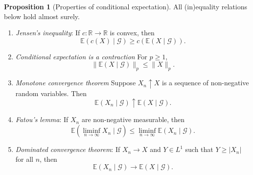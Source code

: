 \documentclass[parskip=full]{article}
\theoremstyle{definition}
\newtheorem{proposition}{Proposition}[section]
\newcommand{\R}{\mathbb{R}}
\newcommand{\1}{\mathbbm{1}}
\newcommand{\E}{\mathbb{E}}
\begin{document}
\begin{proposition}[Properties of conditional expectation] 
  \label{Properties of conditional expectation}
  All (in)equality relations below hold almost surely.
  \begin{enumerate}
    \item \emph{Jensen's inequality}: If $c: \R \to \R$ is convex, then
          \[
            \E(c(X) \mid \mathcal{G}) \geq c(\E(X \mid \mathcal{G})).
          \]
    \item \emph{Conditional expectation is a contraction} For $p \geq 1$,
          \[
            \|\E(X \mid \mathcal{G})\|_p \leq \|X\|_p.
          \]
    \item \emph{Monotone convergence theorem} Suppose $X_n \uparrow X$ is a sequence of non-negative random variables. Then
          \[
            \E(X_n\mid \mathcal{G}) \uparrow \E(X \mid \mathcal{G}).
          \]
    \item \emph{Fatou's lemma}: If $X_n$ are non-negative measurable, then
          \[
            \E\left(\liminf_{n \to \infty} X_n \mid \mathcal{G}\right) \leq \liminf_{n \to \infty} \E(X_n \mid \mathcal{G}).
          \]
    \item \emph{Dominated convergence theorem}: If $X_n \to X$ and $Y \in L^1$ such that $Y \geq |X_n|$ for all $n$, then
          \[
            \E(X_n \mid \mathcal{G}) \to \E(X \mid \mathcal{G}).
          \]
  \end{enumerate}
\end{proposition}
\end{document}

